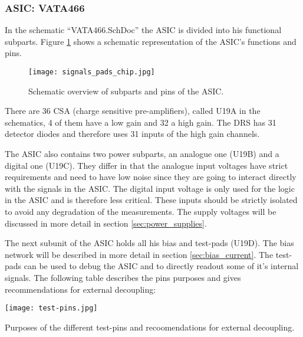 \subsubsection{ASIC: VATA466}
\label{sec:asic}
In the schematic ``VATA466.SchDoc'' the ASIC is divided into his functional subparts.
Figure \ref{fig:signals_pads} shows a schematic representation of the ASIC's functions and pins.
\begin{figure}[H]
    \centering
    \texttt{[image: signals\_pads\_chip.jpg]}
    \caption[Signals and Chip Pad Frame]{Schematic overview of subparts and pins of the ASIC.\cite[p. 14, fig. 3]{Meier2016VATA466}}
    \label{fig:signals_pads}
\end{figure}

There are 36 CSA (charge sensitive pre-amplifiers), called U19A in the schematics, 4 of them have a low gain and 32 a high gain.
The DRS has 31 detector diodes and therefore uses 31 inputs of the high gain channels.

The ASIC also contains two power subparts, an analogue one (U19B) and a digital one (U19C).
They differ in that the analogue input voltages have strict requirements and need to have low noise since they are going to interact directly with the signals in the ASIC.
The digital input voltage is only used for the logic in the ASIC and is therefore less critical.
These inputs should be strictly isolated to avoid any degradation of the measurements.
The supply voltages will be discussed in more detail in section \ref{sec:power_supplies}.

The next subunit of the ASIC holds all his bias and test-pads (U19D).
The bias network will be described in more detail in section \ref{sec:bias_current}.
The test-pads can be used to debug the ASIC and to directly readout some of it's internal signals.
The following table describes the pins purposes and gives recommendations for external decoupling:
\begin{table}[H]
	\centering
    \texttt{[image: test-pins.jpg]}
    \caption[Test-pins Purpose and External Decoupling]{Purposes of the different test-pins and recoomendations for external decoupling.\cite[p. 65-66, tab. 31]{Meier2016VATA466}}
	\label{tab:test-pads}
\end{table}

